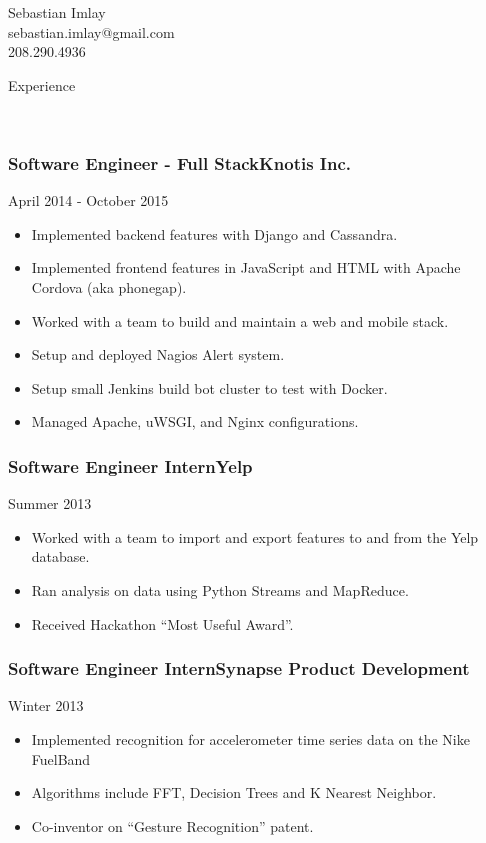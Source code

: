 \documentclass[9pt]{article}
\newenvironment{changemargin}[2]{%
  \begin{list}{}{%
    \setlength{\topsep}{0pt}%
    \setlength{\leftmargin}{#1}%
    \setlength{\rightmargin}{#2}%
    \setlength{\listparindent}{\parindent}%
    \setlength{\itemindent}{\parindent}%
    \setlength{\parsep}{\parskip}%
  }%
  \item[]}{\end{list}
}
\newcommand{\lineover}{
    \begin{changemargin}{-0.05in}{-0.05in}
        \vspace*{-8pt}
        \hrulefill \\
        \vspace*{-2pt}
    \end{changemargin}
}
\newcommand{\header}[1]{
    \begin{changemargin}{-0.5in}{-0.5in}
        {\large #1}\\
        \lineover
    \end{changemargin}
}
\newcommand{\contact}[4]{
    \begin{changemargin}{-0.5in}{-0.5in}
        \begin{center}
            {\Large {#1}}\\ \smallskip
            {#2}\\ \smallskip
            {#3}
        \end{center}
    \end{changemargin}
}
\newenvironment{body} {
    \vspace*{-16pt}
    \begin{changemargin}{-0.20in}{-0.5in}
  }
    {\end{changemargin}
}
\newenvironment{jobdescriptionlist}[3]{
  \subsubsection*{#1\hfill\small#2}
  \small
  \vspace*{-5pt}
  {\hfill #3}
  \vspace*{-10pt}
  \begin{itemize}
   \setlength{\topsep}{0pt}
   \setlength{\itemsep}{1pt}
   \setlength{\parskip}{0pt}
   \setlength{\parsep}{0pt}
}{\end{itemize}\vspace*{-3pt}\normalsize}
\begin{document}

\begin{changemargin}{-0.5in}{-0.5in}
    \begin{center}
        {\Large Sebastian Imlay}\\ \smallskip
        {sebastian.imlay@gmail.com}\\ \smallskip
        {208.290.4936}
    \end{center}
\end{changemargin}


\header{Experience}

\begin{body}
    \vspace{18pt}
    \begin{jobdescriptionlist}{Software Engineer - Full Stack}{Knotis Inc.}{April 2014 - October 2015}
        \item Implemented backend features with Django and Cassandra.
        \item Implemented frontend features in JavaScript and HTML with Apache Cordova (aka phonegap).
        \item Worked with a team to build and maintain a web and mobile stack.
        \item Setup and deployed Nagios Alert system.
        \item Setup small Jenkins build bot cluster to test with Docker.
        \item Managed Apache, uWSGI, and Nginx configurations.
    \end{jobdescriptionlist}

    \begin{jobdescriptionlist}{Software Engineer Intern}{Yelp}{Summer 2013}
        \item Worked with a team to import and export features to and from the Yelp database.
        \item Ran analysis on data using Python Streams and MapReduce.
        \item Received Hackathon ``Most Useful Award''.
    \end{jobdescriptionlist}

    \begin{jobdescriptionlist}{Software Engineer Intern}{Synapse Product Development}{Winter 2013}
        \item Implemented recognition for accelerometer time series data on the Nike FuelBand
        \item Algorithms include FFT, Decision Trees and K Nearest Neighbor.
        \item Co-inventor on ``Gesture Recognition'' patent.
    \end{jobdescriptionlist}


\end{body}
\end{document}
